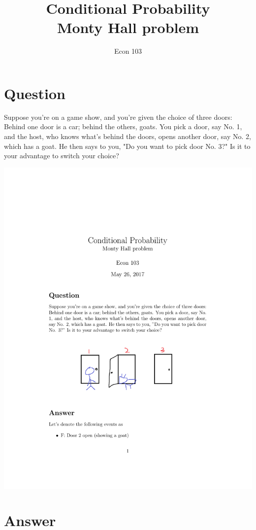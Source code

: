 \documentclass[12pt]{article}
\title{Conditional Probability\\ \large Monty Hall problem}
\author{Econ 103}
\begin{document}
\maketitle

\section*{Question}

Suppose you're on a game show, and you're given the choice of three doors: Behind one door is a car; behind the others, goats. You pick a door, say No. 1, and the host, who knows what's behind the doors, opens another door, say No. 2, which has a goat. He then says to you, "Do you want to pick door No. 3?" Is it to your advantage to switch your choice? 


\begin{center}
\includegraphics[scale = 0.45]{MontyHall}
\end{center}

\section*{Answer}
\end{document}
